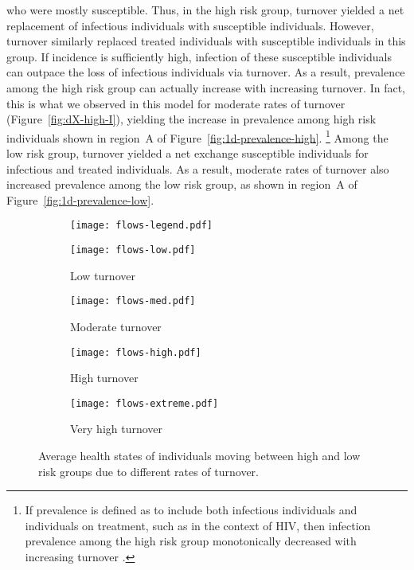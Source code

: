 who were mostly susceptible.
Thus, in the high risk group,
turnover yielded a net replacement of infectious individuals with susceptible individuals.
However, turnover similarly replaced treated individuals
with susceptible individuals in this group.
If incidence is sufficiently high,
infection of these susceptible individuals can
outpace the loss of infectious individuals via turnover.
As a result, prevalence among the high risk group
can actually increase with increasing turnover.
In fact, this is what we observed in this model for moderate rates of turnover
(Figure~\ref{fig:dX-high-I}),
yielding the increase in prevalence among high risk individuals
shown in region~A of Figure~\ref{fig:1d-prevalence-high}.%
\footnote{If prevalence is defined as to include
  both infectious individuals and individuals on treatment,
  such as in the context of HIV,
  then infection prevalence among the high risk group
  monotonically decreased with increasing turnover \citep{Knight2019}.}
Among the low risk group, turnover yielded a net exchange susceptible individuals
for infectious and treated individuals.
As a result, moderate rates of turnover also
increased prevalence among the low risk group,
as shown in region~A of Figure~\ref{fig:1d-prevalence-low}.
\par
\begin{figure}[!tbp]
  \centering
  \begin{subfigure}[t]{0.6\linewidth}
    \centering
    \texttt{[image: flows-legend.pdf]}
  \end{subfigure}
  \begin{subfigure}[t]{0.2\linewidth}
    \centering
    \texttt{[image: flows-low.pdf]}
    \caption{Low turnover}
    \label{fig:flows-low}
  \end{subfigure}%
  \begin{subfigure}[t]{0.2\linewidth}
    \centering
    \texttt{[image: flows-med.pdf]}
    \caption{Moderate turnover}
    \label{fig:flows-med}
  \end{subfigure}%
  \begin{subfigure}[t]{0.2\linewidth}
    \centering
    \texttt{[image: flows-high.pdf]}
    \caption{High turnover}
    \label{fig:flows-high}
  \end{subfigure}%
  \begin{subfigure}[t]{0.2\linewidth}
    \centering
    \texttt{[image: flows-extreme.pdf]}
    \caption{Very high turnover}
    \label{fig:flows-extreme}
  \end{subfigure}
  \caption{Average health states of individuals
    moving between high and low risk groups due to different rates of turnover.}
  \label{fig:flows}
\end{figure}
